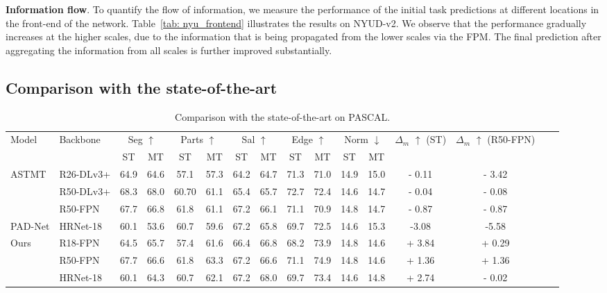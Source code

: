 \documentclass[runningheads]{llncs}
\begin{document}
\noindent\textbf{Information flow}.
To quantify the flow of information, we measure the performance of the initial task predictions at different locations in the front-end of the network. Table~\ref{tab: nyu_frontend} illustrates the results on NYUD-v2. We observe that the performance gradually increases at the higher scales, due to the information that is being propagated from the lower scales via the FPM. The final prediction after aggregating the information from all scales is further improved substantially. 

\subsection{Comparison with the state-of-the-art}
\label{sec:sota}

\begin{table}[t]
\caption{Comparison with the state-of-the-art on PASCAL.}
\label{tab: sota_pascal}
\centering
\tiny{
\begin{tabular}{|l|l|c|c|c|c|c|c|c|c|c|c|c|c|c|c|}
\hline
\multirow{2}{*}{Model} & \multirow{2}{*}{Backbone} & \multicolumn{2}{|c|}{Seg $\uparrow$} & \multicolumn{2}{|c|}{Parts $\uparrow$} & \multicolumn{2}{|c|}{Sal $\uparrow$} & \multicolumn{2}{|c|}{Edge $\uparrow$} & \multicolumn{2}{|c|}{Norm $\downarrow$} & \multirow{2}{*}{$\Delta_{m}$ $\uparrow$ (ST)} & \multirow{2}{*}{$\Delta_{m}$ $\uparrow$ (R50-FPN)}\\ \cline{3-12}
& & ST & MT & ST & MT & ST & MT & ST & MT & ST & MT & & \\
\hline
\multirow{3}{*}{ASTMT \cite{maninis2019attentive}} & R26-DLv3+ & 64.9 & 64.6 & 57.1 & 57.3 & 64.2 & 64.7 & 71.3 & 71.0 & 14.9 & 15.0 & - 0.11 & - 3.42 \\
& R50-DLv3+ & 68.3 & 68.0 & 60.70 & 61.1 & 65.4 & 65.7 & 72.7 & 72.4 & 14.6 & 14.7 & - 0.04 & - 0.08 \\
& R50-FPN & 67.7 & 66.8 & 61.8 & 61.1 & 67.2 & 66.1 & 71.1 & 70.9 & 14.8 & 14.7 & - 0.87 & - 0.87 \\
\hline
PAD-Net\cite{xu2018pad} & HRNet-18 & 60.1 & 53.6 & 60.7 & 59.6 & 67.2 & 65.8 & 69.7 & 72.5 & 14.6 & 15.3 & -3.08 & -5.58 \\
\hline
\multirow{3}{*}{Ours} & R18-FPN & 64.5 & 65.7 & 57.4 & 61.6 & 66.4 & 66.8 & 68.2 & 73.9 & 14.8 & 14.6 & + 3.84 & + 0.29 \\
& R50-FPN & 67.7 & 66.6 & 61.8 & 63.3 & 67.2 & 66.6 & 71.1 & 74.9 & 14.8 & 14.6 & + 1.36 & + 1.36 \\
& HRNet-18 & 60.1 & 64.3 & 60.7 & 62.1 & 67.2 & 68.0 & 69.7 & 73.4 & 14.6 & 14.8 & + 2.74 & - 0.02 \\
\hline
\end{tabular}}
\end{table}
\end{document}
